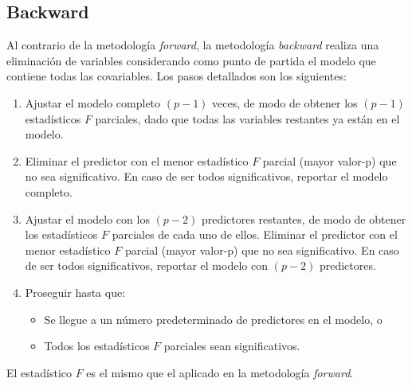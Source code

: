 \documentclass[
  11pt,
]{book}
\providecommand{\tightlist}{%
  \setlength{\itemsep}{0pt}\setlength{\parskip}{0pt}}
\theoremstyle{definition}
\theoremstyle{definition}
\theoremstyle{definition}
\theoremstyle{definition}
\theoremstyle{remark}
\begin{document}
\subsection{Backward}\label{regresion-lineal-seleccion-variables-backward}

Al contrario de la metodología \emph{forward}, la metodología \emph{backward} realiza una eliminación de variables considerando como punto de partida el modelo que contiene todas las covariables. Los pasos detallados son los siguientes:

\begin{enumerate}
\def\labelenumi{\arabic{enumi}.}
\tightlist
\item
  Ajustar el modelo completo \((p − 1)\) veces, de modo de obtener los \((p − 1)\) estadísticos \(F\) parciales, dado que todas las variables restantes ya están en el modelo.
\item
  Eliminar el predictor con el menor estadístico \(F\) parcial (mayor valor-p) que no sea significativo. En caso de ser todos significativos, reportar el modelo completo.
\item
  Ajustar el modelo con los \((p − 2)\) predictores restantes, de modo de obtener los estadísticos \(F\) parciales de cada uno de ellos. Eliminar el predictor con el menor estadístico \(F\) parcial (mayor valor-p) que no sea significativo. En caso de ser todos significativos, reportar el modelo con \((p − 2)\) predictores.
\item
  Proseguir hasta que:

  \begin{itemize}
  \tightlist
  \item
    Se llegue a un número predeterminado de predictores en el modelo, o
  \item
    Todos los estadísticos \(F\) parciales sean significativos.
  \end{itemize}
\end{enumerate}

El estadístico \(F\) es el mismo que el aplicado en la metodología \emph{forward}.
\end{document}
